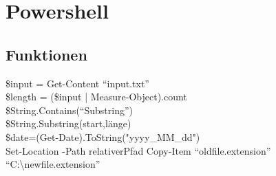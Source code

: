 \chapter{Powershell}\label{chap:Powershell}
\section{Funktionen}
\$input = Get-Content \enquote{input.txt}\\
\$length = (\$input | Measure-Object).count\\
\$String.Contains(\enquote{Substring})\\
\$String.Substring(start,länge)\\
\$date=(Get-Date).ToString("yyyy\_MM\_dd")\\
Set-Location -Path relativerPfad
Copy-Item \enquote{oldfile.extension} \enquote{C:\textbackslash newfile.extension}\\
